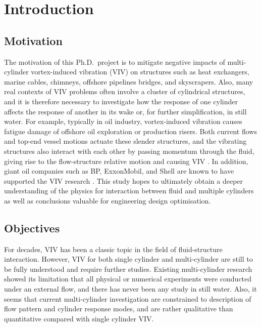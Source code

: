 

\chapter{Introduction} \label{cha Introduction}

\section{Motivation}
The motivation of this Ph.D.\ project is to mitigate negative impacts of multi-cylinder vortex-induced vibration (VIV) on structures such as heat exchangers, marine cables, chimneys, offshore pipelines bridges, and skyscrapers. Also, many real contexts of VIV problems often involve a cluster of cylindrical structures, and it is therefore necessary to investigate how the response of one cylinder affects the response of another in its wake \cite{mit:advVIV} or, for further simplification, in still water. For example, typically in oil industry, vortex-induced vibration causes fatigue damage of offshore oil exploration or production risers. Both current flows and top-end vessel motions actuate these slender structures, and the vibrating structures also interact with each other by passing momentum through the fluid, giving rise to the flow-structure relative motion and causing VIV \cite{wiki:VIV}. In addition, giant oil companies such as BP, ExxonMobil, and Shell are known to have supported the VIV research \cite{CenterforOceanEngineeringMITCambridgeMA}. This study hopes to ultimately obtain a deeper understanding of the physics for interaction between fluid and multiple cylinders as well as conclusions valuable for engineering design optimisation.

\section{Objectives}
For decades, VIV has been a classic topic in the field of fluid-structure interaction. However, VIV for both single cylinder and multi-cylinder are still to be fully understood and require further studies. Existing multi-cylinder research showed its limitation that all physical or numerical experiments were conducted under an external flow, and there has never been any study in still water. Also, it seems that current multi-cylinder investigation are constrained to description of flow pattern and cylinder response modes, and are rather qualitative than quantitative compared with single cylinder VIV. 

